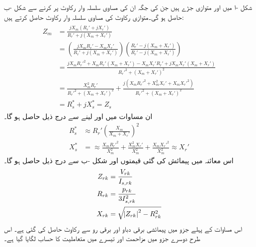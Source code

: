 شکل  -ا میں   اور  متوازی جڑے ہیں جن  کی جگہ ان کی مساوی سلسلہ وار رکاوٹ پر کرنے سے شکل -ب حاصل ہو گی۔متوازی رکاوٹ  کی مساوی سلسلہ وار رکاوٹ   حاصل کرتے ہیں:
\begin{gather}
\begin{aligned}
Z_m&=\frac{j X_m (R_r'+j X_r')}{R_r'+j(X_m+X_r')}\\
&=\left( \frac{j X_m R_r' -X_m X_r'}{R_r'+j(X_m+X_r')} \right) \left( \frac{R_r'-j(X_m+X_r')}{R_r'-j(X_m+X_r')}\right)\\
&=\frac{jX_m R_r'^2+X_m R_r'(X_m+X_r')-X_m X_r' R_r' +j X_m X_r'(X_m+X_r')}{R_r'^2+(X_m+X_r')^2}\\
&=\frac{X_m^2 R_r'}{R_r'^2+(X_m+X_r')^2}+\frac{j(X_m R_r'^2+X_m^2 X_r'+X_m X_r'^2)}{R_r'^2+(X_m+X_r')^2}\\
&=R_s^*+j X_s^* =Z_s
\end{aligned}
\end{gather}
ان مساوات میں  اور   لینے سے درج ذیل حاصل ہو گا۔
\begin{align}\label{مساوات_امالی_تقریبا_مزاحمت}
R_s^*& \approx R_r' \left(\frac{X_m}{X_m+X_r'} \right)^2 \\
X_s^*&= \approx  \frac{X_m R_r'^2}{X_m^2}+\frac{X_m^2 X_r'}{X_m^2}+\frac{X_m X_r'^2}{X_m^2} \approx X_r'
\end{align}
اس معائنہ میں پیمائش کی گئی قیمتوں اور شکل -ب سے درج ذیل حاصل ہو گا۔
\begin{gather}
\begin{aligned}
Z_{rk} &=\frac{V_{rk}}{I_{s,rk}}\\
R_{rk}&=\frac{p_{rk}}{3 I_{s,rk}^2}\\
X_{rk}&=\sqrt{\abs{Z_{rk}}^2-R_{rk}^2}
\end{aligned}
\end{gather}
اس مساوات کے پہلے جزو میں پیمائشی برقی دباو اور برقی رو سے رکاوٹ حاصل کی گئی ہے۔ اس طرح دوسرے جزو میں مزاحمت اور تیسرے میں متعاملیت کا حساب لگایا گیا ہے۔

